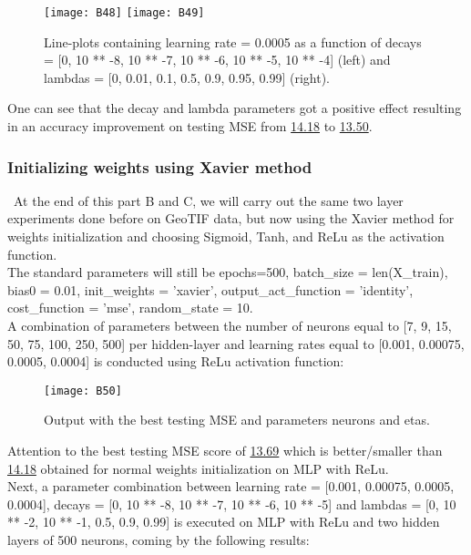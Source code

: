 \begin{figure}[H]
\label{fig:B31}
\centering
\texttt{[image: B48]}
\texttt{[image: B49]}
\caption{Line-plots containing learning rate = 0.0005 as a function of decays = [0, 10 ** -8, 10 ** -7, 10 ** -6, 10 ** -5, 10 ** -4] (left) and lambdas = [0, 0.01, 0.1, 0.5, 0.9, 0.95, 0.99] (right).}
\end{figure}

One can see that the decay and lambda parameters got a positive effect resulting in an accuracy improvement on testing MSE from \hyperref[fig:B25]{14.18} to \hyperref[fig:B31]{13.50}.

\subsubsection{Initializing weights using Xavier method}
\label{chap:Initializing weights using Xavier method}

\quad \, At the end of this part B and C, we will carry out the same two layer experiments done before on GeoTIF data, but now using the Xavier method for weights initialization and choosing Sigmoid, Tanh, and ReLu as the activation function.\\

The standard parameters will still be epochs=500, batch\_size = len(X\_train), bias0 = 0.01, init\_weights = 'xavier', output\_act\_function = 'identity', cost\_function = 'mse', random\_state = 10.\\

A combination of parameters between the number of neurons equal to [7, 9, 15, 50, 75, 100, 250, 500] per hidden-layer and learning rates equal to [0.001, 0.00075, 0.0005, 0.0004] is conducted using ReLu activation function:

\begin{figure}[H]
\label{fig:B32}
\centering
\texttt{[image: B50]}
\caption{Output with the best testing MSE and parameters neurons and etas.}
\end{figure}

Attention to the best testing MSE score of \hyperref[fig:B32]{13.69} which is better/smaller than \hyperref[fig:B25]{14.18} obtained for normal weights initialization on MLP with ReLu.\\

Next, a parameter combination between learning rate = [0.001, 0.00075, 0.0005, 0.0004], decays = [0, 10 ** -8, 10 ** -7, 10 ** -6, 10 ** -5] and lambdas = [0, 10 ** -2, 10 ** -1, 0.5, 0.9, 0.99] is executed on MLP with ReLu and two hidden layers of 500 neurons, coming by the following results:


